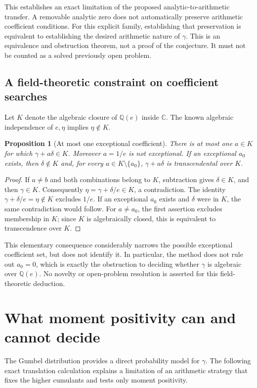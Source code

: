 \documentclass[11pt,a4paper]{article}
\newtheorem{proposition}[theorem]{Proposition}
\theoremstyle{definition}
\theoremstyle{remark}
\numberwithin{equation}{section}
\begin{document}
This establishes an exact limitation of the proposed analytic-to-arithmetic
transfer. A removable analytic zero does not automatically preserve
arithmetic coefficient conditions. For this explicit family, establishing
that preservation is equivalent to establishing the desired arithmetic
nature of $\gamma$. This is an equivalence and obstruction theorem, not
a proof of the conjecture. It must not be counted as a solved previously
open problem.

\subsection{A field-theoretic constraint on coefficient searches}
Let $K$ denote the algebraic closure of $\mathbb Q(e)$ inside $\mathbb C$.
The known algebraic independence of $e,\eta$ implies $\eta\notin K$.

\begin{proposition}[At most one exceptional coefficient]
There is at most one $a\in K$ for which $\gamma+a\delta\in K$.
Moreover $a=1/e$ is not exceptional. If an exceptional $a_0$ exists, then
$\delta\notin K$ and, for every $a\in K\setminus\{a_0\}$,
$\gamma+a\delta$ is transcendental over $K$.
\end{proposition}
\begin{proof}
If $a\ne b$ and both combinations belong to $K$, subtraction gives
$\delta\in K$, and then $\gamma\in K$. Consequently
$\eta=\gamma+\delta/e\in K$, a contradiction. The identity
$\gamma+\delta/e=\eta\notin K$ excludes $1/e$. If an exceptional $a_0$
exists and $\delta$ were in $K$, the same contradiction would follow.
For $a\ne a_0$, the first assertion excludes membership in $K$; since
$K$ is algebraically closed, this is equivalent to transcendence over $K$.
\end{proof}

This elementary consequence considerably narrows the possible exceptional
coefficient set, but does not identify it. In particular, the method does
not rule out $a_0=0$, which is exactly the obstruction to deciding whether
$\gamma$ is algebraic over $\mathbb Q(e)$. No novelty or open-problem
resolution is asserted for this field-theoretic deduction.


\section{What moment positivity can and cannot decide}
\label{p1:sec:gumbel-moments}

The Gumbel distribution provides a direct probability model for $\gamma$.
The following exact translation calculation explains a limitation of
an arithmetic strategy that fixes the higher cumulants and tests only
moment positivity.
\end{document}
